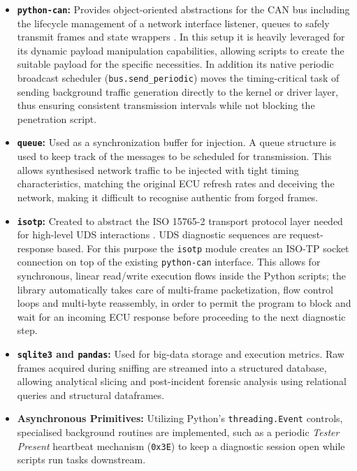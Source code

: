 \begin{itemize}
    \item \textbf{\texttt{python-can}:} Provides object-oriented abstractions for the \gls{CAN} bus including the lifecycle management of a network interface listener, queues to safely transmit frames and state wrappers \cite{python_can_library}. In this setup it is heavily leveraged for its dynamic payload manipulation capabilities, allowing scripts to create the suitable payload for the specific necessities. In addition its native periodic broadcast scheduler (\texttt{bus.send\_periodic}) moves the timing-critical task of sending background traffic generation directly to the kernel or driver layer, thus ensuring consistent transmission intervals while not blocking the penetration script.
    \item \textbf{\texttt{queue}:} Used as a synchronization buffer for injection. A queue structure is used to keep track of the messages to be scheduled for transmission. This allows synthesised network traffic to be injected with tight timing characteristics, matching the original \gls{ECU} refresh rates and deceiving the network, making it difficult to recognise authentic from forged frames.
    \item \textbf{\texttt{isotp}:} Created to abstract the ISO 15765-2 transport protocol layer needed for high-level \gls{UDS} interactions \cite{python_isotp_library}. \gls{UDS} diagnostic sequences are request-response based. For this purpose the \texttt{isotp} module creates an ISO-\gls{TP} socket connection on top of the existing \texttt{python-can} interface. This allows for synchronous, linear read/write execution flows inside the Python scripts; the library automatically takes care of multi-frame packetization, flow control loops and multi-byte reassembly, in order to permit the program to block and wait for an incoming \gls{ECU} response before proceeding to the next diagnostic step.
    \item \textbf{\texttt{sqlite3} and \texttt{pandas}:} Used for big-data storage and execution metrics. Raw frames acquired during sniffing are streamed into a structured database, allowing analytical slicing and post-incident forensic analysis using relational queries and structural dataframes.
    \item \textbf{Asynchronous Primitives:} Utilizing Python's \texttt{threading.Event} controls, specialised background routines are implemented, such as a periodic \textit{Tester Present} heartbeat mechanism (\texttt{0x3E}) to keep a diagnostic session open while scripts run tasks downstream.
\end{itemize}

